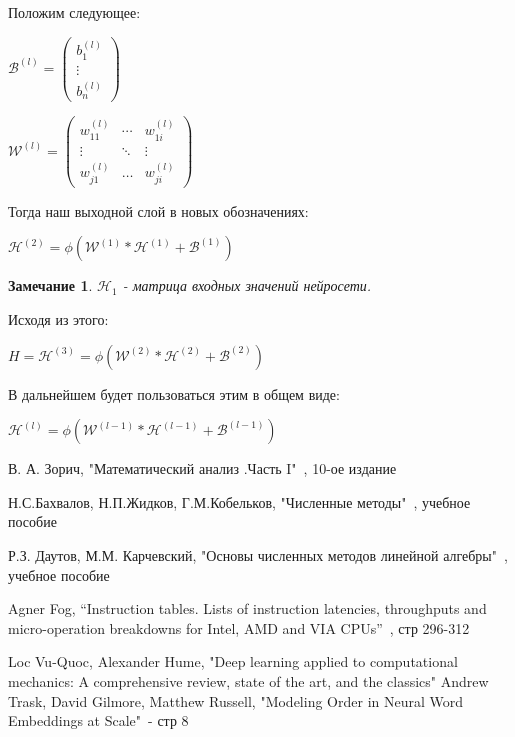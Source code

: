 \documentclass[12pt]{extarticle}
\newtheorem*{remark}{Замечание}
\begin{document}
		
		Положим следующее:
		
		\centerline{$\mathcal{B}^{(l)} = \begin{pmatrix}
		b_1^{(l)} \\
		\vdots \\
		b_n^{(l)} \end{pmatrix} $}
		
		\centerline{$\mathcal{W}^{(l)} = \begin{pmatrix}
		w_{11}^{(l)} & \cdots & w_{1i}^{(l)} \\ 
		\vdots & \ddots & \vdots \\
		w_{j1}^{(l)} & \dots & w_{ji}^{(l)} \end{pmatrix}$}
		
	Тогда наш выходной слой в новых обозначениях:
	
	\centerline{$\mathcal{H}^{(2)} =\phi(\mathcal{W}^{(1)} * \mathcal{H}^{(1)} +  \mathcal{B}^{(1)})$}
	
	\begin{remark}
		$\mathcal{H}_1$ - матрица входных значений нейросети.
	\end{remark}
	
	Исходя из этого:
	
	\centerline{$H = \mathcal{H}^{(3)} = \phi(\mathcal{W}^{(2)} * \mathcal{H}^{(2)} +  \mathcal{B}^{(2)})$}
	
	В дальнейшем будет пользоваться этим в общем виде:
	
	\centerline{$\mathcal{H}^{(l)} =  \phi(\mathcal{W}^{(l-1)} * \mathcal{H}^{(l-1)}+  \mathcal{B}^{(l-1)})$}
	\newpage	
{}
 
\begin{thebibliography}{}
     В. А. Зорич, "Математический анализ .Часть I"\ , 10-ое издание

      Н.С.Бахвалов, Н.П.Жидков, Г.М.Кобельков,
"Численные методы"\ , учебное пособие

     Р.З. Даутов, М.М. Карчевский, "Основы численных методов линейной алгебры"\ , учебное пособие
    
     Agner Fog, “Instruction tables. Lists of instruction latencies, throughputs and micro-operation breakdowns for Intel, AMD and VIA CPUs”\ , стр 296-312 \newline
    
    
     Loc Vu-Quoc, Alexander Hume, "Deep learning applied to computational mechanics: A comprehensive review, state of the art, and the classics"
     Andrew Trask, David Gilmore, Matthew Russell, "Modeling Order in Neural Word Embeddings at Scale"\ - стр 8
    
\end{thebibliography}
\end{document}
